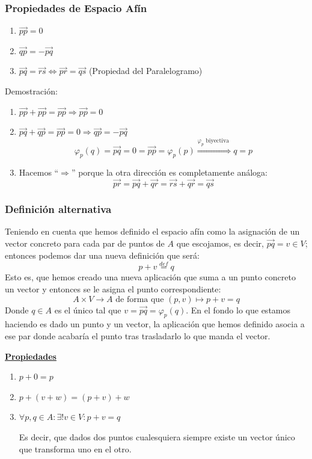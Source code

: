 \documentclass[10pt,a4paper,openright]{book}
\begin{document}
\subsubsection*{Propiedades de Espacio Afín}
\begin{enumerate}
\item $\vec{pp} = 0$

\item $\vec{qp} = - \vec{pq}$

\item $\vec{pq} = \vec{rs} \Leftrightarrow \vec{pr} = \vec{qs}$ (Propiedad del Paralelogramo)
\end{enumerate}

Demostración:
\begin{enumerate}
\item $\vec{pp} + \vec{pp} = \vec{pp} \Rightarrow \vec{pp} = 0$

\item $\vec{pq} + \vec{qp} = \vec{pp} = 0 \Rightarrow \vec{qp}=-\vec{pq}$
$$\varphi_p(q) = \vec{pq} = 0 = \vec{pp} = \varphi_p (p) \overset{\varphi_p \mbox{ biyectiva }}{\Rightarrow} q = p$$

\item Hacemos ``$\Rightarrow$'' porque la otra dirección es completamente análoga:
$$\vec{pr} = \vec{pq} + \vec{qr} = \vec{rs} + \vec{qr} = \vec{qs}$$
\end{enumerate}

\subsubsection*{Definición alternativa}
Teniendo en cuenta que hemos definido el espacio afín como la asignación de un vector concreto para cada par de puntos de $A$ que escojamos, es decir, $\vec{pq} = v \in V$; entonces podemos dar una nueva definición que será:
$$p + v \overset{def}{=} q$$
Esto es, que hemos creado una nueva aplicación que suma a un punto concreto un vector y entonces se le asigna el punto correspondiente:
$$A \times V \to A\mbox{ de forma que } (p,v) \mapsto p + v = q$$
Donde $q \in A$ es el único tal que $v = \vec{pq} = \varphi_p(q)$. En el fondo lo que estamos haciendo es dado un punto y un vector, la aplicación que hemos definido asocia a ese par donde acabaría el punto tras trasladarlo lo que manda el vector.

\underline{\textbf{Propiedades}}
\begin{enumerate}
\item $p + 0 = p$

\item $p + (v+ w) = (p + v)+ w$

\item $\forall p,q \in A: \exists! v \in V : p + v = q$

Es decir, que dados dos puntos cualesquiera siempre existe un vector único que transforma uno en el otro.
\end{enumerate}
\end{document}
